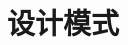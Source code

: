 \documentclass[../../interview-questions.tex]{subfiles}
\begin{document}
\section{设计模式}


\end{document}
